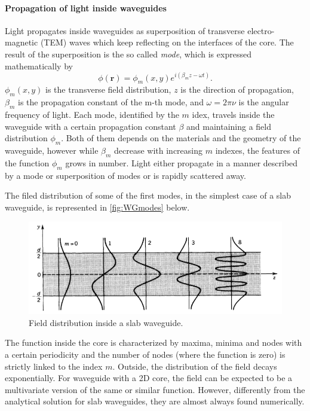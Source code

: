\paragraph{Propagation of light inside waveguides\\}
\noindent Light propagates inside waveguides as superposition of transverse electro-magnetic (TEM) waves which keep reflecting on the interfaces of the core.
The result of the superposition is the so called \textit{mode}, which is expressed mathematically by
\begin{equation}
	\phi(\textbf{r}) = \phi_m\left( x, y \right) e^{i\left( \beta_m z - \omega t \right)}.
\end{equation}
$\phi_m\left( x, y \right)$ is the transverse field distribution, $z$ is the direction of propagation, $\beta_m$ is the propagation constant of the m-th mode, and $\omega=2\pi \nu$ is the angular frequency of light.
Each mode, identified by the $m$ idex, travels inside the waveguide with a certain propagation constant $\beta$ and maintaining a field distribution $\phi_m$.
Both of them depends on the materials and the geometry of the waveguide, however while $\beta_m$ decrease with increasing $m$ indexes, the features of the function $\phi_m$ grows in number.
Light either propagate in a manner described by a mode or superposition of modes or is rapidly scattered away.

The filed distribution of some of the first modes, in the simplest case of a slab waveguide, is represented in \autoref{fig:WGmodes} below.
\begin{figure}[ht]
	\centering
	\includegraphics[scale=0.8]{figures/modes.png}
	\caption{Field distribution inside a slab waveguide.}
	\label{fig:WGmodes}
\end{figure}
The function inside the core is characterized by maxima, minima and nodes with a certain periodicity and the number of nodes (where the function is zero) is strictly linked to the index $m$.
Outside, the distribution of the field decays exponentially.
For waveguide with a 2D core, the field can be expected to be a multivariate version of the same or similar function.
However, differently from the analytical solution for slab waveguides, they are almost always found numerically.

